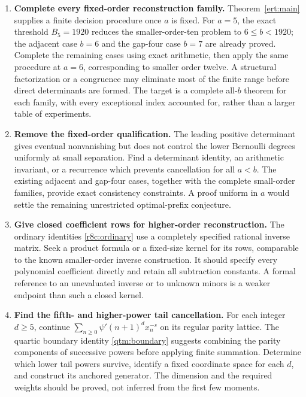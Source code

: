 \documentclass[11pt,a4paper]{article}
\numberwithin{equation}{section}
\theoremstyle{plain}
\theoremstyle{definition}
\theoremstyle{remark}
\begin{document}
\begin{enumerate}[leftmargin=*,label=\textbf{R\arabic*.}]
\item \textbf{Complete every fixed-order reconstruction family.}
Theorem~\ref{ert:main} supplies a finite decision procedure once $a$
is fixed. For $a=5$, the exact threshold $B_5=1920$ reduces the
smaller-order-ten problem to $6\le b<1920$; the adjacent case
$b=6$ and the gap-four case $b=7$ are already proved. Complete the
remaining cases using exact arithmetic, then apply the same procedure
at $a=6$, corresponding to smaller order twelve. A structural
factorization or a congruence may eliminate most of the finite range
before direct determinants are formed.  The target is a complete
all-$b$ theorem for each family, with every exceptional index accounted
for, rather than a larger table of experiments.

\item \textbf{Remove the fixed-order qualification.}
The leading positive determinant gives eventual nonvanishing but does
not control the lower Bernoulli degrees uniformly at small separation.
Find a determinant identity, an arithmetic invariant, or a recurrence
which prevents cancellation for all $a<b$.  The existing adjacent
and gap-four cases, together with the complete small-order families,
provide exact consistency constraints.  A proof uniform in $a$ would
settle the remaining unrestricted optimal-prefix conjecture.

\item \textbf{Give closed coefficient rows for higher-order reconstruction.}
The ordinary identities \eqref{r8c:ordinary} use a completely specified
rational inverse matrix.  Seek a product formula or a fixed-size kernel
for its rows, comparable to the known smaller-order inverse construction.
It should specify every polynomial coefficient directly and retain all
subtraction constants.  A formal reference to an unevaluated inverse
or to unknown minors is a weaker endpoint than such a closed kernel.

\item \textbf{Find the fifth- and higher-power tail cancellation.}
For each integer $d\ge5$, continue
$\sum_{n\ge0}\psi'(n+1)^d x_n^{-s}$ on its regular parity lattice.
The quartic boundary identity \eqref{qtm:boundary} suggests combining
the parity components of successive powers before applying finite
summation.  Determine which lower tail powers survive, identify a fixed
coordinate space for each $d$, and construct its anchored generator.
The dimension and the required weights should be proved, not inferred
from the first few moments.


\end{enumerate}
\end{document}
